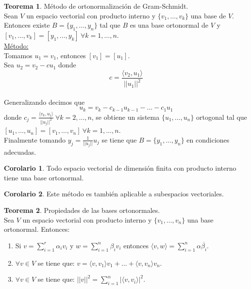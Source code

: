\documentclass[10pt]{article}
\theoremstyle{definition}
\newtheorem{theorem}{Teorema}[section]
\newtheorem{corollary}{Corolario}[theorem]
\begin{document}
\begin{theorem}{Método de ortonormalización de Gram-Schmidt.}
	\\Sean $V$ un espacio vectorial con producto interno y $\{v_1,\dots,v_k\}$ una base de $V$. Entonces existe \newline $B=\{y_1,\dots,y_n\}$ tal que $B$ es una base ortonormal de $V$ y $[v_1,\dots,v_k]=[y_1,\dots,y_k]\ \forall k=1,\dots,n$.\\
	\underline{Método:}
	\\Tomamos $u_1=v_1$, entonces $[v_1]=[u_1]$.
	\\Sea $u_2=v_2-cu_1$ donde $$c=\frac{\langle v_2,u_1 \rangle}{||u_1||^2}$$
	\\Generalizando decimos que $$u_k=v_k-c_{k-1}u_{k-1}-\dots-c_1u_1$$ donde $c_j=\frac{\langle v_k,u_j \rangle}{||u_j||^2}\ \forall k=2,\dots,n$, se obtiene un sistema $\{u_1,\dots,u_n\}$ ortogonal tal que $[u_1,\dots,u_n]=[v_1,\dots,v_n]\ \forall k=1,\dots,n$.
	\\Finalmente tomando $y_j=\frac{1}{||u_j||}u_j$ se tiene que $B=\{y_1,\dots,y_n\}$ en condiciones adecuadas.
\end{theorem}
\begin{corollary}
	Todo espacio vectorial de dimensión finita con producto interno tiene una base ortonormal.
\end{corollary}
\begin{corollary}
	Este método es también aplicable a subespacios vectoriales.
\end{corollary}
\begin{theorem}{Propiedades de las bases ortonormales.}
	\\Sea $V$ un espacio vectorial con producto interno y $\{v_1,\dots,v_n\}$ una base ortonormal. Entonces:
	\begin{enumerate}
		\item Si $v=\sum_{i=1}^{r} \alpha_iv_i$ y $w=\sum_{i=1}^{n} \beta_iv_i$ entonces $\langle v,w \rangle=\sum_{i=1}^{n} \alpha \overline{\beta_i}$.
		\item $\forall v\in V$ se tiene que: $v=\langle v,v_1 \rangle v_1+\dots+\langle v,v_n \rangle v_n$.
		\item $\forall v\in V$ se tiene que: $||v||^2=\sum_{i=1}^{n} |\langle v,v_i \rangle|^2$.
	\end{enumerate}
\end{theorem}
\end{document}
